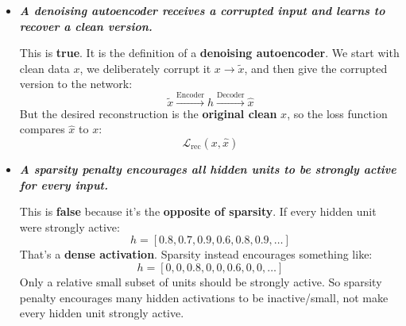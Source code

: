\begin{itemize}
    \item[\textcolor{Green3}{\textbf{T.}}] \textcolor{Green3}{\textbf{\emph{A denoising autoencoder receives a corrupted input and learns to recover a clean version.}}}

        This is \textbf{true}. It is the definition of a \textbf{denoising autoencoder}. We start with clean data $x$, we deliberately corrupt it $x \to \tilde{x}$, and then give the corrupted version to the network:
        \begin{equation*}
            \tilde{x} \xrightarrow{\text{Encoder}} h \xrightarrow{\text{Decoder}} \hat{x}
        \end{equation*}
        But the desired reconstruction is the \textbf{original clean} $x$, so the loss function compares $\hat{x}$ to $x$:
        \begin{equation*}
            \mathcal{L}_{\text{rec}}\left(x, \hat{x}\right)
        \end{equation*}

    \item[\textcolor{Red2}{\textbf{F.}}]  \textcolor{Red2}{\textbf{\emph{A sparsity penalty encourages all hidden units to be strongly active for every input.}}}

        This is \textbf{false} because it's the \textbf{opposite of sparsity}. If every hidden unit were strongly active:
        \begin{equation*}
            h = \left[
                0.8, 0.7, 0.9, 0.6, 0.8, 0.9, \dots
            \right]
        \end{equation*}
        That's a \textbf{dense activation}. Sparsity instead encourages something like:
        \begin{equation*}
            h = \left[
                0, 0, 0.8, 0, 0, 0.6, 0, 0, \dots
            \right]
        \end{equation*}
        Only a relative small subset of units should be strongly active. So sparsity penalty encourages many hidden activations to be inactive/small, not make every hidden unit strongly active.
\end{itemize}